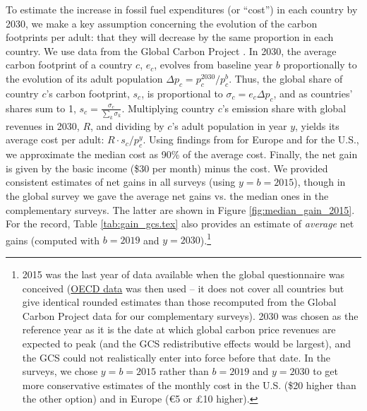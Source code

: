 \documentclass[12pt,english]{article}
\begin{document}
To estimate the increase in fossil fuel expenditures (or ``cost'') in each country by 2030, we make a key assumption concerning the evolution of the carbon footprints per adult: that they will decrease by the same proportion %
in each country. We use data from the Global Carbon Project \citep{peters_synthesis_2012}. 
In 2030, the average carbon footprint of a country $c$, $e_c$, evolves from baseline year $b$ proportionally to the evolution of its adult population $\Delta p_c = p^{2030}_c/p^b_c$. Thus, the global share of country $c$'s carbon footprint, $s_c$, is proportional to $\sigma_c = e_c \Delta p_c$, and as countries' shares sum to 1, $s_c = \frac{\sigma_c}{\sum_k \sigma_k}$. Multiplying country $c$'s emission share with global revenues in 2030, $R$, and dividing by $c$'s adult population in year $y$, yields its average cost per adult: $R \cdot s_c / p^y_c$. %
Using findings from \citet{ivanova_unequal_2020} for Europe and \citet{fremstad_impact_2019} for the U.S., we approximate the median cost as 90\% of the average cost. Finally, the net gain is given by the basic income (\$30 per month) minus the cost. We provided consistent estimates of net gains in all surveys (using $y = b = 2015$), though in the global survey we gave the average net gains vs. the median ones in the complementary surveys. The latter are shown in Figure \ref{fig:median_gain_2015}. 
For the record, Table \ref{tab:gain_gcs.tex} also provides an estimate of \textit{average} net gains (computed with $b = 2019$ and $y = 2030$).\footnote{2015 was the last year of data available when the global questionnaire was conceived (\href{https://stats.oecd.org/Index.aspx?DataSetCode=IO_GHG_2019}{OECD data} was then used -- it does not cover all countries but give identical rounded estimates than those recomputed from the Global Carbon Project data for our complementary surveys). 2030 was chosen as the reference year as it is the date at which global carbon price revenues are expected to peak (and the GCS redistributive effects would be largest), and the GCS could not realistically enter into force before that date. In the surveys, we chose $y = b = 2015$ rather than $b = 2019$ and $y = 2030$ to get more conservative estimates of the monthly cost in the U.S. (\$20 higher than the other option) and in Europe (\euro{5} or £10 higher).}%
\end{document}
